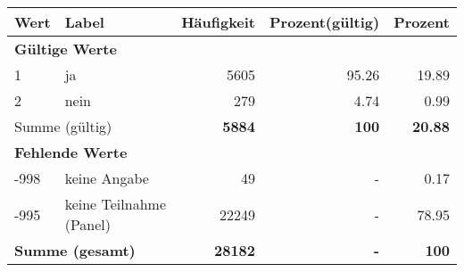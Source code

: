      \begin{longtable}{lXrrr}
     \toprule
     \textbf{Wert} & \textbf{Label} & \textbf{Häufigkeit} & \textbf{Prozent(gültig)} & \textbf{Prozent} \\
     \endhead
     \midrule
     \multicolumn{5}{l}{\textbf{Gültige Werte}}\\

     1 &
     \multicolumn{1}{X}{ ja   } &


       \num{5605} &
       \num[round-mode=places,round-precision=2]{95,26} &
         \num[round-mode=places,round-precision=2]{19,89} \\

     2 &
     \multicolumn{1}{X}{ nein   } &


       \num{279} &
       \num[round-mode=places,round-precision=2]{4,74} &
         \num[round-mode=places,round-precision=2]{0,99} \\
     \midrule
     \multicolumn{2}{l}{Summe (gültig)} &
       \textbf{\num{5884}} &
     \textbf{100} &
       \textbf{\num[round-mode=places,round-precision=2]{20,88}} \\
     \multicolumn{5}{l}{\textbf{Fehlende Werte}}\\
       -998 &
       keine Angabe &
         \num{49} &
        - &
         \num[round-mode=places,round-precision=2]{0,17} \\
       -995 &
       keine Teilnahme (Panel) &
         \num{22249} &
        - &
         \num[round-mode=places,round-precision=2]{78,95} \\
     \midrule
     \multicolumn{2}{l}{\textbf{Summe (gesamt)}} &
          \textbf{\num{28182}} &
        \textbf{-} &
        \textbf{100} \\
     \bottomrule
     \end{longtable}
     
